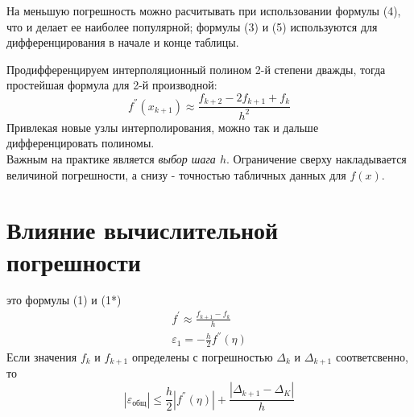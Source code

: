 \documentclass[a4paper,11pt]{article}
\begin{document}
\begin{importantblock}
  На меньшую погрешность можно расчитывать при использовании формулы (4), что и делает ее наиболее популярной;
  формулы (3) и (5) используются для дифференцирования в начале и конце таблицы.\\
\end{importantblock}

Продифференцируем интерполяционный полином 2-й степени дважды, тогда простейшая формула для 2-й производной:
\begin{equation}
  f^{''}(x_{k+1}) \approx \frac{f_{k+2}-2f_{k+1}+f_k}{h^2}
\end{equation}
Привлекая новые узлы интерполирования, можно так и дальше дифференцировать полиномы.\\

Важным на практике является \textit{выбор шага $h$}. Ограничение сверху накладывается величиной погрешности,
а снизу - точностью табличных данных для $f(x)$.

\section{Влияние вычислительной погрешности}
\marginpar
{
  \vspace{6mm}
  \footnotesize{это формулы (1) и (1*)}
}
\begin{gather*}
  f^{'} \approx \frac{f_{k+1}-f_k}{h} \\
  \varepsilon_1 = - \frac{h}{2}f^{''}(\eta)
\end{gather*}
Если значения $f_k$ и $f_{k+1}$ определены с погрешностью $\Delta_k$ и $\Delta_{k+1}$ соответсвенно, то
\begin{equation*}
  \boxed{|\varepsilon_{\text{общ}}| \le \frac{h}{2}|f^{''}(\eta)| + \frac{|\Delta_{k+1}-\Delta_K|}{h}}
\end{equation*}
\end{document}
